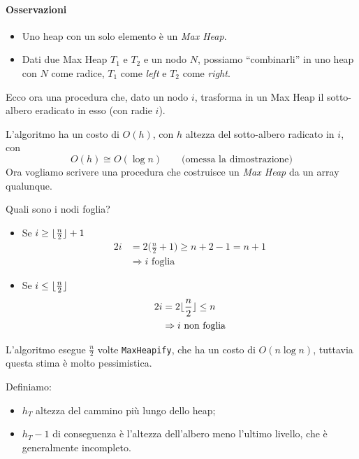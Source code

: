 \paragraph{Osservazioni}
\begin{itemize}[label=$\bullet$]
	\item Uno heap con un solo elemento è un \emph{Max Heap}.
	\item Dati due Max Heap $T_1$ e $T_2$ e un nodo $N$, possiamo ``combinarli'' in uno heap con
	$N$ come radice, $T_1$ come \emph{left} e $T_2$ come \emph{right}.
\end{itemize}

Ecco ora una procedura che, dato un nodo $i$, trasforma in un Max Heap il sotto-albero eradicato in esso (con radie $i$).



L'algoritmo ha un costo di $O(h)$, con $h$ altezza del sotto-albero radicato in $i$, con 
$$O(h) \cong O(\log n) \qquad \text{(omessa la dimostrazione)}$$
Ora vogliamo scrivere una procedura che costruisce un \emph{Max Heap} da un array qualunque. \par
Quali sono i nodi foglia?
\begin{itemize}
	\item Se $i \geq \lfloor\frac{n}{2}\rfloor + 1$
	\begin{align*}
		2i & = 2\Big( \frac{n}{2} + 1 \Big) \geq n + 2 - 1 = n + 1 \\
		& \Rightarrow i \text{ foglia}
	\end{align*}
	\item Se $i \leq \lfloor\frac{n}{2}\rfloor$
	\begin{align*}
		2i & = 2 \lfloor\frac{n}{2}\rfloor \leq n \\
		& \Rightarrow i \text{ non foglia}
	\end{align*}
\end{itemize}


L'algoritmo esegue $\frac{n}{2}$ volte \texttt{MaxHeapify}, che ha un costo di $O(n \log n)$, 
tuttavia questa stima è molto pessimistica.\par
Definiamo: 
\begin{itemize}[noitemsep]
	\item $h_T$ altezza del cammino più lungo dello heap;
	\item $h_T - 1$ di conseguenza è l'altezza dell'albero meno l'ultimo livello, che è
	generalmente incompleto.
\end{itemize}

